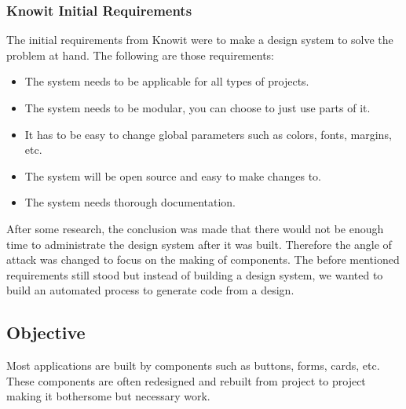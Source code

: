 \subsubsection{Knowit Initial Requirements}%
\label{ssub:Knowit Initial Requirements}
The initial requirements from Knowit were to make a design system\cite{fanguyComprehensiveGuideDesign} to solve the problem at hand. The following are those requirements: 
\begin{itemize}
  \item The system needs to be applicable for all types of projects.
  \item The system needs to be modular, you can choose to just use parts of it.
  \item It has to be easy to change global parameters such as colors, fonts, margins, etc.
  \item The system will be open source and easy to make changes to.
  \item The system needs thorough documentation.
\end{itemize}

After some research, the conclusion was made that there would not be enough time to administrate the design system after it was built. Therefore the angle of attack was changed to focus on the making of components. The before mentioned requirements still stood but instead of building a design system, we wanted to build an automated process to generate code from a design. 








\subsection{Objective}
\label{sub:Objective}
Most applications are built by components such as buttons, forms, cards\cite{babichSimpleDesignTips2020}, etc. These components are often redesigned and rebuilt from project to project making it bothersome but necessary work.


